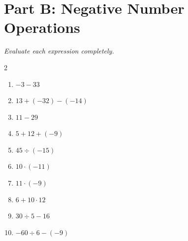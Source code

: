 \documentclass[11pt]{article}
\begin{document}
\section*{Part B: Negative Number Operations}
\noindent\textit{Evaluate each expression completely.}
\begin{multicols}{2}
\begin{enumerate}
  \item $-3 - 33$
  \vspace{1.1cm}
  \item $13 + (-32) - (-14)$
  \vspace{1.1cm}
  \item $11 - 29$
  \vspace{1.1cm}
  \item $5 + 12 + (-9)$
  \vspace{1.1cm}
  \item $45 \div (-15)$
  \vspace{1.1cm}
  \item $10 \cdot (-11)$
  \vspace{1.1cm}
  \item $11 \cdot (-9)$
  \vspace{1.1cm}
  \item $6 + 10 \cdot 12$
  \vspace{1.1cm}
  \item $30 \div 5 - 16$
  \vspace{1.1cm}
  \item $-60 \div 6 - (-9)$
  \vspace{1.1cm}
\end{enumerate}
\end{multicols}
\end{document}
